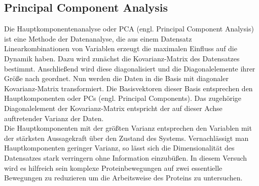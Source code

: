 \subsection{Principal Component Analysis}
Die Hauptkomponentenanalyse oder PCA (engl. Principal Component Analysis) ist eine Methode der Datenanalyse, die aus einem Datensatz Linearkombinationen von Variablen erzeugt die maximalen Einfluss auf die Dynamik haben.
Dazu wird zunächst die Kovarianz-Matrix des Datensatzes bestimmt. Anschließend wird diese diagonalisiert und die Diagonalelemente ihrer Größe nach geordnet. Nun werden die Daten in die Basis mit diagonaler Kovarianz-Matrix transformiert.
Die Basisvektoren dieser Basis entsprechen den Hauptkomponenten oder PCs (engl. Principal Components).
Das zugehörige Diagonalelement der Kovarianz-Matrix entspricht der auf dieser Achse auftretender Varianz der Daten.
\\ \noindent
Die Hauptkomponenten mit der größten Varianz entsprechen den Variablen mit der stärksten Aussagekraft über den Zustand des Systems. Vernachlässigt man Hauptkomponenten geringer Varianz, so lässt sich die Dimensionalität des Datensatzes stark verringern ohne Information einzubüßen.
In diesem Versuch wird es hilfreich sein komplexe Proteinbewegungen auf zwei essentielle Bewegungen zu reduzieren um die Arbeitsweise des Proteins zu untersuchen.
